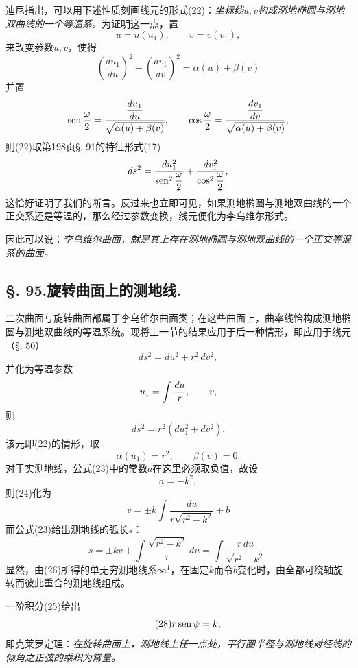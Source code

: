 迪尼指出，可以用下述性质刻画线元的形式(22)：\emph{坐标线\(u,v\)构成测地椭圆与测地双曲线的一个等温系。}为证明这一点，置
\[
 u=u(u_1),\qquad v=v(v_1),
\]
来改变参数\(u,v\)，使得
\[
 \left(\frac{du_1}{du}\right)^2+\left(\frac{dv_1}{dv}\right)^2=\alpha(u)+\beta(v)
\]
并置
\[
 \operatorname{sen}\frac{\omega}{2}=\frac{\dfrac{du_1}{du}}{\sqrt{\alpha(u)+\beta(v)}},\qquad
 \cos\frac{\omega}{2}=\frac{\dfrac{dv_1}{dv}}{\sqrt{\alpha(u)+\beta(v)}},
\]
则(22)取第198页\S. 91的特征形式(17)
\[
 ds^2=\frac{du_1^2}{\operatorname{sen}^2\dfrac{\omega}{2}}+\frac{dv_1^2}{\cos^2\dfrac{\omega}{2}},
\]
这恰好证明了我们的断言。反过来也立即可见，如果测地椭圆与测地双曲线的一个正交系还是等温的，那么经过参数变换，线元便化为李乌维尔形式。

因此可以说：\emph{李乌维尔曲面，就是其上存在测地椭圆与测地双曲线的一个正交等温系的曲面。}

\subsection*{\S. 95.\quad 旋转曲面上的测地线.}

二次曲面与旋转曲面都属于李乌维尔曲面类；在这些曲面上，曲率线恰构成测地椭圆与测地双曲线的等温系统。现将上一节的结果应用于后一种情形，即应用于线元（\S. 50）
\[
 ds^2=du^2+r^2\,dv^2,
\]
并化为等温参数
\[
 u_1=\int\frac{du}{r},\qquad v,
\]
则
\[
 ds^2=r^2(du_1^2+dv^2).
\]
该元即(22)的情形，取
\[
 \alpha(u_1)=r^2,
  \qquad
  \beta(v)=0.
\]
对于实测地线，公式(23)中的常数\(a\)在这里必须取负值，故设
\[
 a=-k^2,
\]
则(24)化为
\begin{equation}\tag{26}
 v=\pm k\int\frac{du}{r\sqrt{r^2-k^2}}+b
\end{equation}
而公式(23)给出测地线的弧长\(s\)：
\begin{equation}\tag{27}
 s=\pm kv+\int\frac{\sqrt{r^2-k^2}}{r}\,du=\int\frac{r\,du}{\sqrt{r^2-k^2}}.
\end{equation}
显然，由(26)所得的单无穷测地线系\(\infty^1\)，在固定\(k\)而令\(b\)变化时，由全都可绕轴旋转而彼此重合的测地线组成。

一阶积分(25)给出
\begin{equation}\tag{28}
 r\operatorname{sen}\psi=k,
\end{equation}
即克莱罗定理：\emph{在旋转曲面上，测地线上任一点处，平行圈半径与测地线对经线的倾角之正弦的乘积为常量。}

